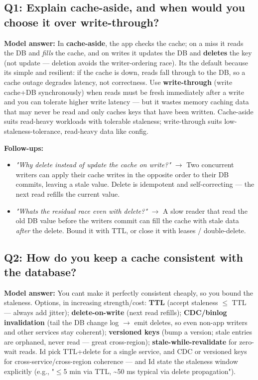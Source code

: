 \documentclass[11pt]{article}
\providecommand{\tightlist}{\setlength{\itemsep}{1pt}\setlength{\parskip}{0pt}}
\begin{document}
\subsection{Q1: Explain cache-aside, and when would you choose it over write-through?}\label{q1-explain-cache-aside-and-when-would-you-choose-it-over-write-through}

\textbf{Model answer:} In \textbf{cache-aside}, the app checks the cache; on a miss it reads the DB and \emph{fills} the cache, and on writes it updates the DB and \textbf{deletes} the key (not update --- deletion avoids the writer-ordering race). It\textquotesingle s the default because it\textquotesingle s simple and resilient: if the cache is down, reads fall through to the DB, so a cache outage degrades latency, not correctness. Use \textbf{write-through} (write cache+DB synchronously) when reads must be fresh immediately after a write and you can tolerate higher write latency --- but it wastes memory caching data that may never be read and only caches keys that have been written. Cache-aside suits read-heavy workloads with tolerable staleness; write-through suits low-staleness-tolerance, read-heavy data like config.

\textbf{Follow-ups:}

\begin{itemize}
\tightlist
\item
  \emph{"Why delete instead of update the cache on write?"} \(\rightarrow\) Two concurrent writers can apply their cache writes in the opposite order to their DB commits, leaving a stale value. Delete is idempotent and self-correcting --- the next read refills the current value.
\item
  \emph{"What\textquotesingle s the residual race even with delete?"} \(\rightarrow\) A slow reader that read the old DB value before the writer\textquotesingle s commit can fill the cache with stale data \emph{after} the delete. Bound it with TTL, or close it with leases / double-delete.
\end{itemize}

\subsection{Q2: How do you keep a cache consistent with the database?}\label{q2-how-do-you-keep-a-cache-consistent-with-the-database}

\textbf{Model answer:} You can\textquotesingle t make it perfectly consistent cheaply, so you bound the staleness. Options, in increasing strength/cost: \textbf{TTL} (accept staleness \(\leq\) TTL --- always add jitter); \textbf{delete-on-write} (next read refills); \textbf{CDC/binlog invalidation} (tail the DB change log \(\rightarrow\) emit deletes, so even non-app writers and other services stay coherent); \textbf{versioned keys} (bump a version; stale entries are orphaned, never read --- great cross-region); \textbf{stale-while-revalidate} for zero-wait reads. I\textquotesingle d pick TTL+delete for a single service, and CDC or versioned keys for cross-service/cross-region coherence --- and I\textquotesingle d state the staleness window explicitly (e.g., "\(\leq\)5 min via TTL, \textasciitilde50 ms typical via delete propagation").
\end{document}
